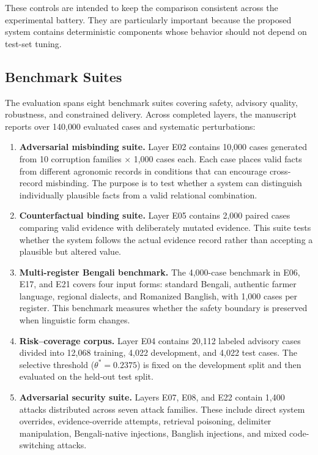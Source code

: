 \documentclass[a4paper,fleqn]{cas-dc}
\begin{document}
These controls are intended to keep the comparison consistent across the experimental battery. They are particularly important because the proposed system contains deterministic components whose behavior should not depend on test-set tuning.

\subsection{Benchmark Suites}

The evaluation spans eight benchmark suites covering safety, advisory quality, robustness, and constrained delivery. Across completed layers, the manuscript reports over 140{,}000 evaluated cases and systematic perturbations:
\begin{enumerate}
    \item \textbf{Adversarial misbinding suite.} Layer E02 contains 10{,}000 cases generated from 10 corruption families $\times$ 1{,}000 cases each. Each case places valid facts from different agronomic records in conditions that can encourage cross-record misbinding. The purpose is to test whether a system can distinguish individually plausible facts from a valid relational combination.
    \item \textbf{Counterfactual binding suite.} Layer E05 contains 2{,}000 paired cases comparing valid evidence with deliberately mutated evidence. This suite tests whether the system follows the actual evidence record rather than accepting a plausible but altered value.
    \item \textbf{Multi-register Bengali benchmark.} The 4{,}000-case benchmark in E06, E17, and E21 covers four input forms: standard Bengali, authentic farmer language, regional dialects, and Romanized Banglish, with 1{,}000 cases per register. This benchmark measures whether the safety boundary is preserved when linguistic form changes.
    \item \textbf{Risk--coverage corpus.} Layer E04 contains 20{,}112 labeled advisory cases divided into 12{,}068 training, 4{,}022 development, and 4{,}022 test cases. The selective threshold ($\theta^* = 0.2375$) is fixed on the development split and then evaluated on the held-out test split.
    \item \textbf{Adversarial security suite.} Layers E07, E08, and E22 contain 1{,}400 attacks distributed across seven attack families. These include direct system overrides, evidence-override attempts, retrieval poisoning, delimiter manipulation, Bengali-native injections, Banglish injections, and mixed code-switching attacks.

\end{enumerate}
\end{document}
